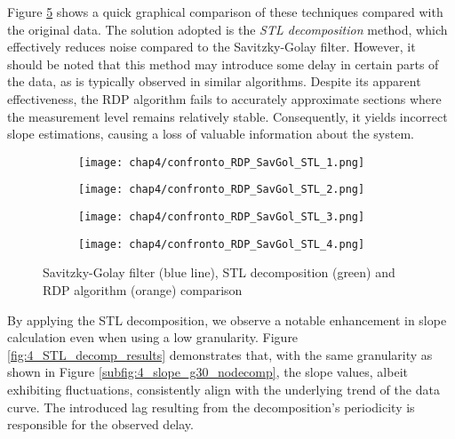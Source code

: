 Figure \ref{fig:4_smoothing_comparison} shows a quick graphical comparison of these techniques compared with the original data. The solution adopted is the \textit{STL decomposition} method, which effectively reduces noise compared to the Savitzky-Golay filter. However, it should be noted that this method may introduce some delay in certain parts of the data, as is typically observed in similar algorithms. Despite its apparent effectiveness, the RDP algorithm fails to accurately approximate sections where the measurement level remains relatively stable. Consequently, it yields incorrect slope estimations, causing a loss of valuable information about the system.

\begin{figure}[H]
	\centering
	\begin{subfigure}{0.48\textwidth}
		\texttt{[image: chap4/confronto\_RDP\_SavGol\_STL\_1.png]}
		\caption{}
		\label{subfig:4_smoothing1}
	\end{subfigure}
	\hfill
	\begin{subfigure}{0.48\textwidth}
		\texttt{[image: chap4/confronto\_RDP\_SavGol\_STL\_2.png]}
		\caption{}
		\label{subfig:4_smoothing2}
	\end{subfigure}
	\begin{subfigure}{0.48\textwidth}
		\texttt{[image: chap4/confronto\_RDP\_SavGol\_STL\_3.png]}
		\caption{}
		\label{subfig:4_smoothing3}
	\end{subfigure}
	\hfill
	\begin{subfigure}{0.48\textwidth}
		\texttt{[image: chap4/confronto\_RDP\_SavGol\_STL\_4.png]}
		\caption{}
		\label{subfig:4_smoothing4}
	\end{subfigure}
	\caption{Savitzky-Golay filter (blue line), STL decomposition (green) and RDP algorithm (orange) comparison}
	\label{fig:4_smoothing_comparison}
\end{figure}
By applying the STL decomposition, we observe a notable enhancement in slope calculation even when using a low granularity. Figure \ref{fig:4_STL_decomp_results} demonstrates that, with the same granularity as shown in Figure \ref{subfig:4_slope_g30_nodecomp}, the slope values, albeit exhibiting fluctuations, consistently align with the underlying trend of the data curve. The introduced lag resulting from the decomposition's periodicity is responsible for the observed delay.

